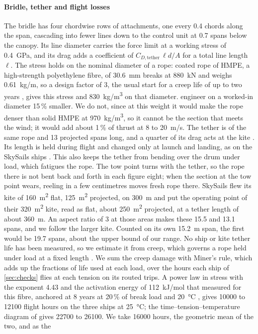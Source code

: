 \paragraph{Bridle, tether and flight losses} The bridle has four chordwise rows of attachments, one every 0.4 chords along the span, cascading into fewer lines down to the control unit at 0.7 spans below the canopy. Its line diameter carries the force limit at a working stress of \SI{0.4}{GPa}, and its drag adds a coefficient of $C_{D,\mathrm{tether}}\,\ell d/A$ for a total line length $\ell$. The stress holds on the nominal diameter of a rope: coated rope of HMPE, a high-strength polyethylene fibre, of \SI{30.6}{mm} breaks at \SI{880}{kN} and weighs \SI{0.61}{kg/m}, so a design factor of 3, the usual start for a creep life of up to two years \citep{bosman2013,fechner2013}, gives this stress and \SI{830}{kg/m^3} on that diameter. \citet{bosman2013} engineer on a worked-in diameter 15\,\% smaller. We do not, since at this weight it would make the rope denser than solid HMPE at \SI{970}{kg/m^3}, so it cannot be the section that meets the wind; it would add about 1\,\% of thrust at 8 to \SI{20}{m/s}. The tether is of the same rope and 13 projected spans long, and a quarter of its drag acts at the kite \citep{vandervlugt2019}. Its length is held during flight and changed only at launch and landing, as on the SkySails ships \citep{erhard2013}. This also keeps the tether from bending over the drum under load, which fatigues the rope. The tow point turns with the tether, so the rope there is not bent back and forth in each figure eight; when the section at the tow point wears, reeling in a few centimetres moves fresh rope there. SkySails flew its kite of \SI{160}{m^2} flat, \SI{125}{m^2} projected, on \SI{300}{m} \citep[Fig.~18]{erhard2013} and \citet{paulig2013} put the operating point of their \SI{320}{m^2} kite, read as flat, about \SI{250}{m^2} projected, at a tether length of about \SI{360}{m}. An aspect ratio of 3 at those areas makes these 15.5 and 13.1 spans, and we follow the larger kite. Counted on its own \SI{15.2}{m} span, the first would be 19.7 spans, about the upper bound of our range.  No ship or kite tether life has been measured, so we estimate it from creep, which governs a rope held under load at a fixed length \citep{bosman2013,humeau2018}. We sum the creep damage with Miner's rule, which adds up the fractions of life used at each load, over the hours each ship of \cref{sec:checks} flies at each tension on its routed trips. A power law in stress with the exponent 4.43 and the activation energy of \SI{112}{kJ/mol} that \citet{humeau2018} measured for this fibre, anchored at 8 years at 20\,\% of break load and \SI{20}{\celsius} \citep{dsm_sk78_mooring}, gives \num{10000} to \num{12100} flight hours on the three ships at \SI{25}{\celsius}; the time--tension--temperature diagram of \citet{bosman2013} gives \num{22700} to \num{26100}. We take \num{16000} hours, the geometric mean of the two, and as the 